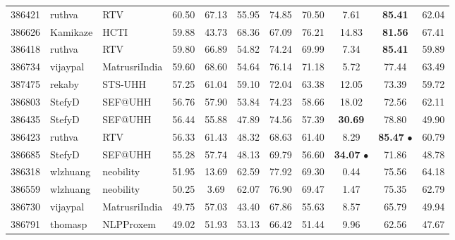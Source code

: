 \documentclass[11pt,a4paper]{article}
\begin{document}
\begin{table*}[htp!!]
\begin{center}
\begin{tabu}{|HHl| *{8}{S[table-format=2.2]|}}
386421 & ruthva & RTV & 60.50 & 67.13 & 55.95 & 74.85 & 70.50 & 7.61 & {\bf 85.41}\hspace{0.55em} & 62.04\\ 

386626 & Kamikaze & HCTI \cite{shao:2017:SemEval} & 59.88 & 43.73 & 68.36 & 67.09 & 76.21 & 14.83 & {\bf 81.56}\hspace{0.55em} & 67.41\\ 

386418 & ruthva & RTV & 59.80 & 66.89 & 54.82 & 74.24 & 69.99 & 7.34 & {\bf 85.41}\hspace{0.55em} & 59.89\\ 

386734 & vijaypal & MatrusriIndia & 59.60 & 68.60 & 54.64 & 76.14 & 71.18 & 5.72 & 77.44 & 63.49\\ 

387475 & rekaby & STS-UHH \cite{kohail-salama-biemann:2017:SemEval} & 57.25 & 61.04 & 59.10 & 72.04 & 63.38 & 12.05 & 73.39 & 59.72\\ 

386803 & StefyD & SEF@UHH \cite{duma-menzel:2017:SemEval} & 56.76 & 57.90 & 53.84 & 74.23 & 58.66 & 18.02 & 72.56 & 62.11\\ 

386435 & StefyD & SEF@UHH \cite{duma-menzel:2017:SemEval} & 56.44 & 55.88 & 47.89 & 74.56 & 57.39 & {\bf 30.69}\hspace{0.55em} & 78.80 & 49.90\\ 

386423 & ruthva & RTV & 56.33 & 61.43 & 48.32 & 68.63 & 61.40 & 8.29 & {\bf 85.47} $\bullet$ & 60.79\\ 

386685 & StefyD & SEF@UHH \cite{duma-menzel:2017:SemEval} & 55.28 & 57.74 & 48.13 & 69.79 & 56.60 & {\bf 34.07} $\bullet$ & 71.86 & 48.78\\ 

386318 & wlzhuang & neobility \cite{zhuang-chang:2017:SemEval} & 51.95 & 13.69 & 62.59 & 77.92 & 69.30 & 0.44 & 75.56 & 64.18\\ 

386559 & wlzhuang & neobility \cite{zhuang-chang:2017:SemEval} & 50.25 & 3.69 & 62.07 & 76.90 & 69.47 & 1.47 & 75.35 & 62.79\\ 

386730 & vijaypal & MatrusriIndia & 49.75 & 57.03 & 43.40 & 67.86 & 55.63 & 8.57 & 65.79 & 49.94\\ 

386791 & thomasp & NLPProxem & 49.02 & 51.93 & 53.13 & 66.42 & 51.44 & 9.96 & 62.56 & 47.67\\ 


\end{tabu}
\end{center}
\end{table*}
\end{document}
